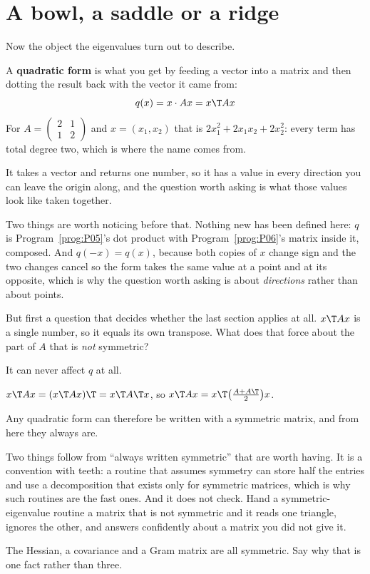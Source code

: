 \section{A bowl, a saddle or a ridge}
\label{sec:P10-forms}

\begin{fr}
Now the object the eigenvalues turn out to describe.

A \textbf{quadratic form} is what you get by feeding a vector into a matrix and
then dotting the result back with the vector it came from:
\[ q(x) = x \cdot Ax = x\T A x \]
For $A = \begin{pmatrix} 2 & 1 \\ 1 & 2 \end{pmatrix}$ and $x = (x_1, x_2)$
that is $2x_1^{2} + 2x_1x_2 + 2x_2^{2}$: every term has total degree two, which
is where the name comes from.

It takes a vector and returns one number, so it has a value in every direction
you can leave the origin along, and the question worth asking is what those
values look like taken together.

Two things are worth noticing before that. Nothing new has been defined here:
$q$ is Program~\ref{prog:P05}'s dot product with Program~\ref{prog:P06}'s
matrix inside it, composed. And $q(-x) = q(x)$, because both copies of $x$
change sign and the two changes cancel \dash{} so the form takes the same value
at a point and at its opposite, which is why the question worth asking is about
\emph{directions} rather than about points.

But first a question that decides whether the last section applies at all.
$x\T Ax$ is a single number, so it equals its own transpose. What does that
force about the part of $A$ that is \emph{not} symmetric?
\dotline
\nextframe
\end{fr}

\begin{fr}
\begin{ansblock}
It can never affect $q$ at all.
\end{ansblock}

$x\T A x = (x\T A x)\T = x\T A\T x$, so $x\T A x = x\T \big(\frac{A + A\T}{2}
\big) x$.

Any quadratic form can therefore be written with a symmetric matrix, and from
here they always are.

Two things follow from \enquote{always written symmetric} that are worth
having. It is a convention with teeth: a routine that assumes symmetry can
store half the entries and use a decomposition that exists only for symmetric
matrices, which is why such routines are the fast ones. And it does not check.
Hand a symmetric-eigenvalue routine a matrix that is not symmetric and it reads
one triangle, ignores the other, and answers confidently about a matrix you did
not give it.

The Hessian, a covariance and a Gram matrix are all symmetric. Say why that is
one fact rather than three.
\dotline
\nextframe
\end{fr}

